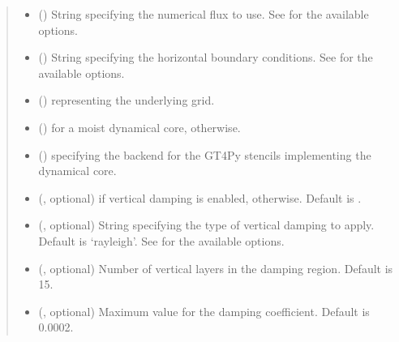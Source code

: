 \documentclass[letterpaper,10pt,english]{sphinxmanual}
\begin{document}
\begin{fulllineitems}
\begin{fulllineitems}
\begin{quote}
\begin{description}
\begin{itemize}
\item {} 
 () \textendash{} String specifying the numerical flux to use.
See {\hyperref[\detokenize{api:tasmania.dycore.flux_isentropic.FluxIsentropic}]{}} for the available options.

\item {} 
 () \textendash{} String specifying the horizontal boundary conditions.
See {\hyperref[\detokenize{api:tasmania.dycore.horizontal_boundary.HorizontalBoundary}]{}} for the available options.

\item {} 
 () \textendash{} {\hyperref[\detokenize{api:tasmania.grids.grid_xyz.GridXYZ}]{}} representing the underlying grid.

\item {} 
 () \textendash{}  for a moist dynamical core,  otherwise.

\item {} 
 () \textendash{}  specifying the backend for the GT4Py stencils implementing the dynamical core.

\item {} 
 (, optional) \textendash{}  if vertical damping is enabled,  otherwise. Default is .

\item {} 
 (, optional) \textendash{} String specifying the type of vertical damping to apply. Default is ‘rayleigh’.
See {\hyperref[\detokenize{api:tasmania.dycore.vertical_damping.VerticalDamping}]{}} for the available options.

\item {} 
 (, optional) \textendash{} Number of vertical layers in the damping region. Default is 15.

\item {} 
 (, optional) \textendash{} Maximum value for the damping coefficient. Default is 0.0002.


\end{itemize}
\end{description}
\end{quote}
\end{fulllineitems}
\end{fulllineitems}
\end{document}
